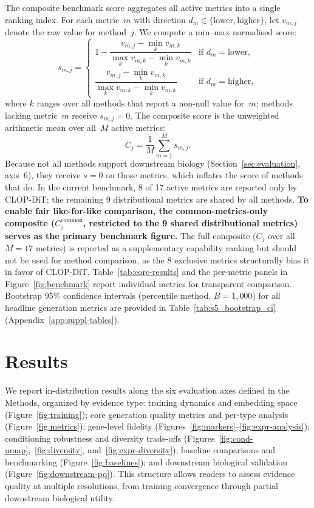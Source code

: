 The composite benchmark score aggregates all active metrics into a single ranking index. For each metric~$m$ with direction $d_m \in \{\text{lower}, \text{higher}\}$, let $v_{m,j}$ denote the raw value for method~$j$. We compute a min--max normalised score:
\begin{equation}
  s_{m,j} =
  \begin{cases}
    1 - \dfrac{v_{m,j} - \min_k v_{m,k}}{\max_k v_{m,k} - \min_k v_{m,k}} & \text{if } d_m = \text{lower},\\[6pt]
    \dfrac{v_{m,j} - \min_k v_{m,k}}{\max_k v_{m,k} - \min_k v_{m,k}} & \text{if } d_m = \text{higher},
  \end{cases}
  \label{eq:norm}
\end{equation}
where $k$ ranges over all methods that report a non-null value for~$m$; methods lacking metric~$m$ receive $s_{m,j} = 0$. The composite score is the unweighted arithmetic mean over all~$M$ active metrics:
\begin{equation}
  C_j = \frac{1}{M}\sum_{m=1}^{M} s_{m,j}.
  \label{eq:composite}
\end{equation}
Because not all methods support downstream biology (Section~\ref{sec:evaluation}, axis~6), they receive $s = 0$ on those metrics, which inflates the score of methods that do. In the current benchmark, 8 of 17 active metrics are reported only by CLOP-DiT; the remaining 9 distributional metrics are shared by all methods. \textbf{To enable fair like-for-like comparison, the common-metrics-only composite ($C_j^{\text{common}}$, restricted to the 9 shared distributional metrics) serves as the primary benchmark figure.} The full composite ($C_j$ over all $M = 17$ metrics) is reported as a supplementary capability ranking but should not be used for method comparison, as the 8 exclusive metrics structurally bias it in favor of CLOP-DiT. Table~\ref{tab:core-results} and the per-metric panels in Figure~\ref{fig:benchmark} report individual metrics for transparent comparison. Bootstrap 95\% confidence intervals (percentile method, $B{=}1{,}000$) for all headline generation metrics are provided in Table~\ref{tab:s5_bootstrap_ci} (Appendix~\ref{app:suppl-tables}).

\section{Results}\label{sec:results}

We report in-distribution results along the six evaluation axes defined in the Methods, organized by evidence type:
training dynamics and embedding space (Figure~\ref{fig:training});
core generation quality metrics and per-type analysis (Figure~\ref{fig:metrics});
gene-level fidelity (Figures~\ref{fig:markers}--\ref{fig:expr-analysis});
conditioning robustness and diversity trade-offs (Figures~\ref{fig:cond-umap},~\ref{fig:diversity}, and~\ref{fig:expr-diversity});
baseline comparisons and benchmarking (Figure~\ref{fig:baselines});
and downstream biological validation (Figure~\ref{fig:downstream-pq}).
This structure allows readers to assess evidence quality at multiple resolutions, from training convergence through partial downstream biological utility.

